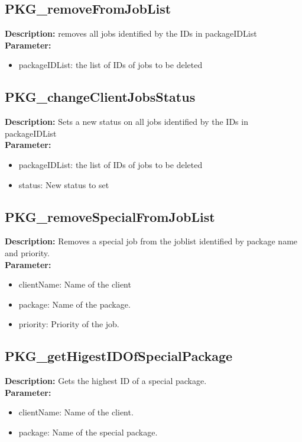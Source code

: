 \subsection{PKG\_removeFromJobList}
\textbf{Description:} removes all jobs identified by the IDs in packageIDList\\
\textbf{Parameter:}
\begin{itemize}
\item packageIDList: the list of IDs of jobs to be deleted
\end{itemize}

\subsection{PKG\_changeClientJobsStatus}
\textbf{Description:} Sets a new status on all jobs identified by the IDs in packageIDList\\
\textbf{Parameter:}
\begin{itemize}
\item packageIDList: the list of IDs of jobs to be deleted
\item status: New status to set
\end{itemize}

\subsection{PKG\_removeSpecialFromJobList}
\textbf{Description:} Removes a special job from the joblist identified by package name and priority.\\
\textbf{Parameter:}
\begin{itemize}
\item clientName: Name of the client
\item package: Name of the package.
\item priority: Priority of the job.
\end{itemize}

\subsection{PKG\_getHigestIDOfSpecialPackage}
\textbf{Description:} Gets the highest ID of a special package.\\
\textbf{Parameter:}
\begin{itemize}
\item clientName: Name of the client.
\item package: Name of the special package.
\end{itemize}


